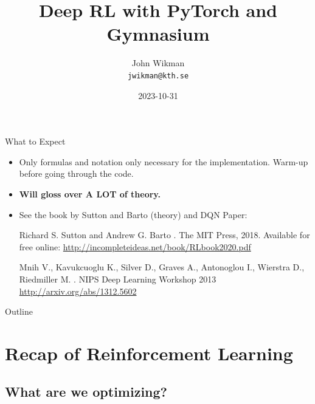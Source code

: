 \documentclass[aspectratio=1609,handout]{beamer}
\title{Deep RL with PyTorch and Gymnasium}
\author{\parbox[t][5mm][c]{5cm}{\centering John Wikman\\\small{\texttt{jwikman@kth.se}}\vspace{5mm}}}
\institute{KTH Royal Institute of Technology}
\date{2023-10-31}
\begin{document}
\frame[plain, t]{\titlepage}



\begin{frame}{What to Expect}
  \begin{itemize}
  \setlength\itemsep{2mm}
  \item<1-> Only formulas and notation only necessary for the
        implementation. Warm-up before going through the code.
  \item<2-> \textbf{Will gloss over A LOT of theory.}
  \item<3-> See the book by Sutton and Barto (theory) and DQN Paper:
  {\small
        \begin{thebibliography}{10}

        \beamertemplatebookbibitems

          Richard S. Sutton and Andrew G. Barto
          .
          \newblock The MIT Press, 2018.
          \vspace{1mm}
          \newblock Available for free online:
          \newblock \url{http://incompleteideas.net/book/RLbook2020.pdf}

        \beamertemplatearticlebibitems

          Mnih V., Kavukcuoglu K., Silver D., Graves A., Antonoglou I., Wierstra D., Riedmiller M.
          .
          \newblock NIPS Deep Learning Workshop 2013
          \newblock \url{http://arxiv.org/abs/1312.5602}
        \end{thebibliography}
  }
  \end{itemize}
\end{frame}

\begin{frame}{Outline}
  \tableofcontents
\end{frame}

\section{Recap of Reinforcement Learning}
\subsection{What are we optimizing?}
\end{document}
